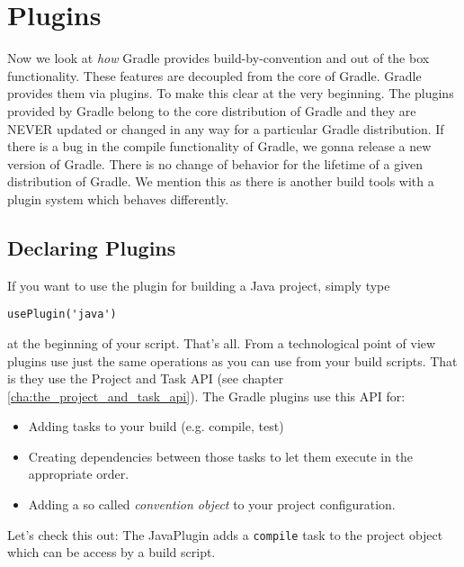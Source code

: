 \chapter{Plugins} %
\label{cha:plugins}
Now we look at \emph{how} Gradle provides build-by-convention and out of the box functionality. These features are decoupled from the core of Gradle. Gradle provides them via plugins. To make this clear at the very beginning. The plugins provided by Gradle belong to the core distribution of Gradle and they are NEVER updated or changed in any way for a particular Gradle distribution. If there is a bug in the compile functionality of Gradle, we gonna release a new version of Gradle. There is no change of behavior for the lifetime of a given distribution of Gradle. We mention this as there is another build tools with a plugin system which behaves differently. 

\section{Declaring Plugins} %
\label{sec:using_plugins}
If you want to use the plugin for building a Java project, simply type
\begin{Verbatim}
usePlugin('java')	
\end{Verbatim}
at the beginning of your script. That's all. From a technological point of view plugins use just the same operations as you can use from your build scripts. That is they use the Project and Task API (see chapter \ref{cha:the_project_and_task_api}). The Gradle plugins use this API for:
\begin{itemize}
	\item Adding tasks to your build (e.g. compile, test)
    \item Creating dependencies between those tasks to let them execute in the appropriate order.
    \item Adding a so called \emph{convention object} to your project configuration.
\end{itemize}
Let's check this out:
The JavaPlugin adds a \texttt{compile} task to the project object which can be access by a build script.

